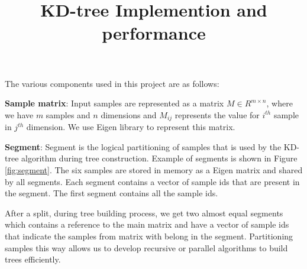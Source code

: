 \documentclass[11pt]{amsart}
\title{KD-tree Implemention and performance}
\begin{document}
\maketitle

The various components used in this project are as follows:

\begin{list}{}{\leftmargin= 1.4cm} \setlength\itemsep{1em}

\item \textbf{Sample matrix}: Input samples are represented as a matrix $M \in R^{m \times n}$, where we have $m$ samples and $n$ dimensions and $M_{ij}$ represents the value for $i^{th}$ sample in $j^{th}$ dimension. We use Eigen library \cite{Guennebaud:2010aa} to represent this matrix.

\item \textbf{Segment}: Segment is the logical partitioning of samples that is used by the KD-tree algorithm during tree construction. Example of segments is shown in Figure \ref{fig:segment}. The six samples are stored in memory as a Eigen matrix and shared by all segments. Each segment contains a vector of sample ids that are present in the segment. The first segment contains all the sample ids. 

After a split, during tree building process, we get two almost equal segments which contains a reference to the main matrix and have a vector of sample ids that indicate the samples from matrix with belong in the segment. Partitioning samples this way allows us to develop recursive or parallel algorithms to build trees efficiently. 


\end{list}
\end{document}
